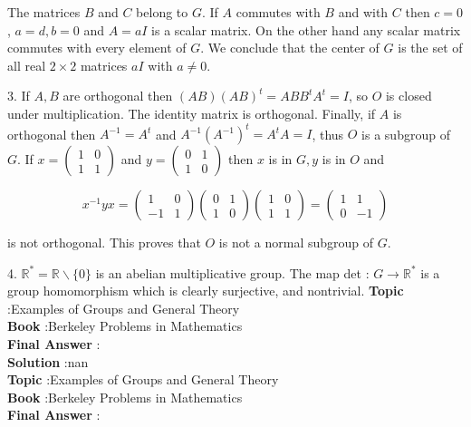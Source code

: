 \documentclass[10pt]{article}
\begin{document}
The matrices $B$ and $C$ belong to $G$. If $A$ commutes with $B$ and with $C$ then $c=0$, $a=d, b=0$ and $A=a I$ is a scalar matrix. On the other hand any scalar matrix commutes with every element of $G$. We conclude that the center of $G$ is the set of all real $2 \times 2$ matrices $a I$ with $a \neq 0$.

3. If $A, B$ are orthogonal then $(A B)(A B)^{t}=A B B^{t} A^{t}=I$, so $O$ is closed under multiplication. The identity matrix is orthogonal. Finally, if $A$ is orthogonal then $A^{-1}=A^{t}$ and $A^{-1}\left(A^{-1}\right)^{t}=A^{t} A=I$, thus $O$ is a subgroup of $G$. If $x=\left(\begin{array}{ll}1 & 0 \\ 1 & 1\end{array}\right)$ and $y=\left(\begin{array}{ll}0 & 1 \\ 1 & 0\end{array}\right)$ then $x$ is in $G, y$ is in $O$ and

$$
x^{-1} y x=\left(\begin{array}{cc}
1 & 0 \\
-1 & 1
\end{array}\right)\left(\begin{array}{ll}
0 & 1 \\
1 & 0
\end{array}\right)\left(\begin{array}{ll}
1 & 0 \\
1 & 1
\end{array}\right)=\left(\begin{array}{cc}
1 & 1 \\
0 & -1
\end{array}\right)
$$

is not orthogonal. This proves that $O$ is not a normal subgroup of $G$.

4. $\mathbb{R}^{*}=\mathbb{R} \backslash\{0\}$ is an abelian multiplicative group. The map det : $G \rightarrow \mathbb{R}^{*}$ is a group homomorphism which is clearly surjective, and nontrivial.
\textbf{Topic} :Examples of Groups and General Theory \\
\textbf{Book} :Berkeley Problems in Mathematics\\
\textbf{Final Answer} :\\


\textbf{Solution} :nan\\
\textbf{Topic} :Examples of Groups and General Theory \\
\textbf{Book} :Berkeley Problems in Mathematics\\
\textbf{Final Answer} :\\
\end{document}
